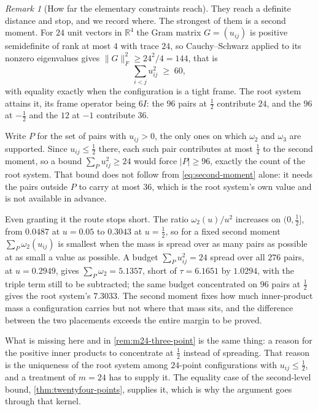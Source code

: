\documentclass[11pt,reqno]{amsart}
\renewcommand{\_}{\origunderscore\allowbreak}
\numberwithin{equation}{section}
\theoremstyle{plain}
\theoremstyle{definition}
\theoremstyle{remark}
\newtheorem{remark}[thm]{Remark}
\begin{document}
\begin{remark}[How far the elementary constraints reach]\label{rem:m24-remains}
They reach a definite distance and stop, and we record where. The strongest of them is a second moment. For $24$ unit vectors
in $\mathbb{R}^4$ the Gram matrix $G=(u_{ij})$ is positive semidefinite
of rank at most $4$ with trace $24$, so Cauchy--Schwarz applied to its
nonzero eigenvalues gives $\|G\|_F^2\ge24^2/4=144$, that is
\begin{equation}\label{eq:second-moment}
  \sum_{i<j}u_{ij}^2\;\ge\;60,
\end{equation}
with equality exactly when the configuration is a tight frame. The root
system attains it, its frame operator being $6I$: the $96$ pairs at
$\tfrac12$ contribute $24$, and the $96$ at $-\tfrac12$ and the $12$ at
$-1$ contribute $36$.

Write $P$ for the set of pairs with $u_{ij}>0$, the only ones on which
$\omega_2$ and $\omega_3$ are supported. Since $u_{ij}\le\tfrac12$
there, each such pair contributes at most $\tfrac14$ to the second
moment, so a bound $\sum_Pu_{ij}^2\ge24$ would force $|P|\ge96$, exactly
the count of the root system. That bound does not follow from
\eqref{eq:second-moment} alone: it needs the pairs outside $P$ to carry
at most $36$, which is the root system's own value and is not available
in advance.

Even granting it the route stops short. The ratio $\omega_2(u)/u^2$
increases on $(0,\tfrac12]$, from $0.0487$ at $u=0.05$ to $0.3043$ at
$u=\tfrac12$, so for a fixed second moment $\sum_P\omega_2(u_{ij})$ is
smallest when the mass is spread over as many pairs as possible at as
small a value as possible. A budget $\sum_Pu_{ij}^2=24$ spread over all
$276$ pairs, at $u=0.2949$, gives $\sum_P\omega_2=5.1357$, short of
$\tau=6.1651$ by $1.0294$, with the triple term still to be subtracted;
the same budget concentrated on $96$ pairs at $\tfrac12$ gives the root
system's $7.3033$. The second moment fixes how much inner-product mass a
configuration carries but not where that mass sits, and the difference
between the two placements exceeds the entire margin to be proved.

What is missing here and in \cref{rem:m24-three-point} is the same
thing: a reason for the positive inner products to concentrate at $\tfrac12$ instead of spreading. That reason is the uniqueness of the root
system among $24$-point configurations with $u_{ij}\le\tfrac12$, and a
treatment of $m=24$ has to supply it. The equality case of the
second-level bound, \cref{thm:twentyfour-points}, supplies it, which is
why the argument goes through that kernel.
\end{remark}
\end{document}
